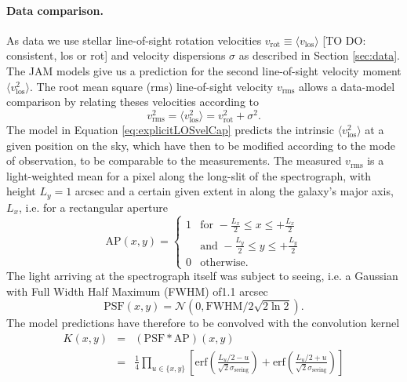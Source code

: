 \paragraph{Data comparison.} As data we use stellar line-of-sight rotation velocities $v_\text{rot} \equiv \langle v_\text{los} \rangle$ [TO DO: consistent, los or rot] and velocity dispersions $\sigma$ as described in Section \ref{sec:data}. The JAM models give us a prediction for the second line-of-sight velocity moment $\langle v_\text{los}^2 \rangle$. The root mean square (rms) line-of-sight velocity $v_\text{rms}$ allows a data-model comparison by relating theses velocities according to 
\begin{equation*}
v_\text{rms}^2 = \langle v_\text{los}^2 \rangle = v_\text{rot}^2 + \sigma^2.
\end{equation*}
The model in Equation \ref{eq:explicitLOSvelCap} predicts the intrinsic $\langle v_\text{los}^2 \rangle$ at a given position on the sky, which have then to be modified according to the mode of observation, to be comparable to the measurements. The measured $v_\text{rms}$ is a light-weighted mean for a pixel along the long-slit of the spectrograph, with height $L_y = 1$ arcsec \citep{SWELLSV} and a certain given extent in along the galaxy's major axis, $L_x$, i.e. for a rectangular aperture
\begin{equation*}
\text{AP}(x,y) = \left\{ \begin{array}{ll} 1 & \text{for } -\frac{L_x}{2} \leq x \leq + \frac{L_x}{2}\\
& \text{and } - \frac{L_y}{2} \leq y \leq + \frac{L_y}{2}  \\ 0 & \text{otherwise.} \end{array} \right.
\end{equation*}
The light arriving at the spectrograph itself was subject to seeing, i.e. a Gaussian with Full Width Half Maximum (FWHM) of1.1 arcsec \citep{SWELLSV}
\begin{equation*}
\text{PSF}(x,y)=\mathscr{N}(0,\text{FWHM}/2\sqrt{2\ln2}).
\end{equation*}
The model predictions have therefore to be convolved with the convolution kernel
\begin{eqnarray*}
K(x,y) &=& (\text{PSF} \ast \text{AP})(x,y) \\
&=& \frac{1}{4} \prod_{u \in \{x,y\}} \left[ \text{erf}\left( \frac{L_u/2 - u}{\sqrt{2}\sigma_\text{seeing}}\right) + \text{erf} \left( \frac{L_u/2 + u}{\sqrt{2} \sigma_\text{seeing}} \right) \right]
\end{eqnarray*}
